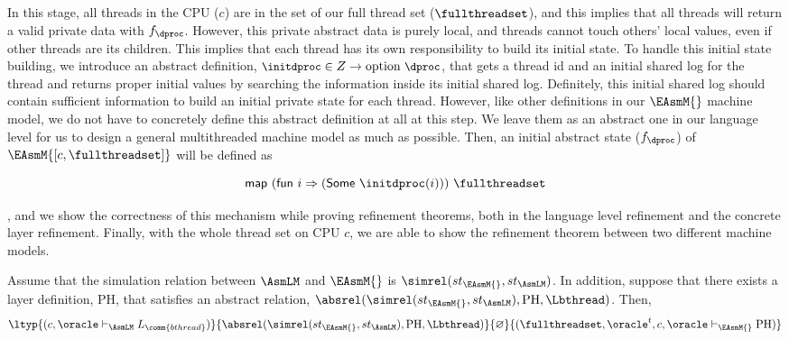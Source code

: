 In this stage, all threads in the CPU ($c$) are in the set of our full thread set ($\fullthreadset$), and this implies that all threads will return a valid private data with $f_{\dproc}$.
However, this private abstract data is purely local, and threads cannot touch 
others' local values, even if other threads are its children.
This implies that each thread has its own responsibility to build its initial state. 
To handle this initial state building, we introduce an abstract definition,
${\small  \initdproc \in Z \rightarrow \mathrm{option}\ \dproc }$,
 that gets a thread id and an initial shared log 
for the thread and returns proper initial values by searching the information inside its initial shared log. 
Definitely, this initial shared log should contain sufficient information to build an initial private state for each thread.
However, like other definitions in our $\EAsmM{}$ machine model, 
we do not have to concretely define this abstract definition at all
at this step. 
We leave them as an abstract one in our language level for us to design a general multithreaded machine model as much as possible.
Then, an initial abstract state ($f_\dproc$) of $\EAsmM{[c, \fullthreadset]}$ will be defined as 
\begin{small}
\[
\mathsf{map}\ (\mathsf{fun}\ i \Rightarrow (\mathsf{Some}\ \initdproc(i))) \ \fullthreadset
\]
\end{small}
, and we show the correctness of this mechanism while proving refinement theorems, 
both in the language level refinement 
and the concrete layer refinement.
Finally, with the whole thread set on CPU $c$, we are able to show the refinement theorem between two different machine models.
\begin{theorem}
\label{theorem:easm_refine_lasm}
\begin{tiny}
Assume that the simulation relation between $\AsmLM$ and $\EAsmM{}$ is $\simrel(st_{\EAsmM{}}, st_{\AsmLM})$.
In addition, suppose that there exists a layer definition, $\mathrm{PH}$, that satisfies an abstract relation, $\absrel(\simrel(st_{\EAsmM{}}, st_{\AsmLM}), \mathrm{PH}, \Lbthread)$. Then,
$$\ltyp{(c, \oracle\vdash_{\AsmLM} L_\comm{bthread})}{\absrel(\simrel(st_{\EAsmM{}}, st_{\AsmLM}), \mathrm{PH}, \Lbthread)}
{\varnothing}{(\fullthreadset, \oracle^t,  c, \oracle  \vdash_{\EAsmM{}} \mathrm{PH})}$$
\end{tiny}
\end{theorem}

